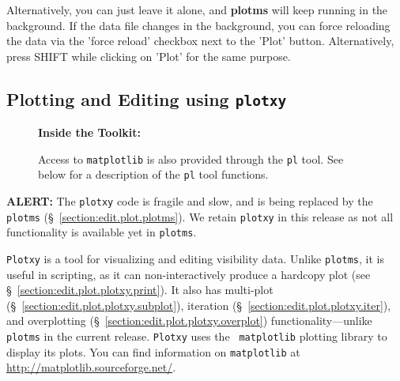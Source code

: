 Alternatively, you can just leave it alone, and {\bf plotms} will keep
running in the background. If the data file changes in the background,
you can force reloading the data via the 'force reload' checkbox
next to the 'Plot' button. Alternatively, press SHIFT while clicking
on 'Plot' for the same purpose.








\subsection{Plotting and Editing using {\tt plotxy}}
\label{section:edit.plot.plotxy}


\begin{wrapfigure}{r}{2.5in}
  \begin{boxedminipage}{2.5in}
     \centerline{\bf Inside the Toolkit:}
     Access to {\tt matplotlib} is also provided through 
     the {\tt pl} tool. 
     See below for a description of the {\tt pl} tool functions. 
  \end{boxedminipage}
\end{wrapfigure}

\vspace{5cm}

{\bf ALERT:} The {\tt plotxy} code is fragile and slow, and is being replaced by the {\tt plotms} (\S~\ref{section:edit.plot.plotms}). We retain {\tt plotxy} in this release as not all functionality is available yet in {\tt plotms}.


{\tt Plotxy} is a tool for visualizing and editing visibility
data. Unlike {\tt plotms}, it is useful in scripting, as it can
non-interactively produce a hardcopy plot (see
\S~\ref{section:edit.plot.plotxy.print}). It also has multi-plot
(\S~\ref{section:edit.plot.plotxy.subplot}), iteration
(\S~\ref{section:edit.plot.plotxy.iter}), and overplotting
(\S~\ref{section:edit.plot.plotxy.overplot}) functionality---unlike
{\tt plotms} in the current release. {\tt Plotxy} uses the {\tt
  matplotlib} plotting library to display its plots. You can find
information on {\tt matplotlib} at
\url{http://matplotlib.sourceforge.net/}.








